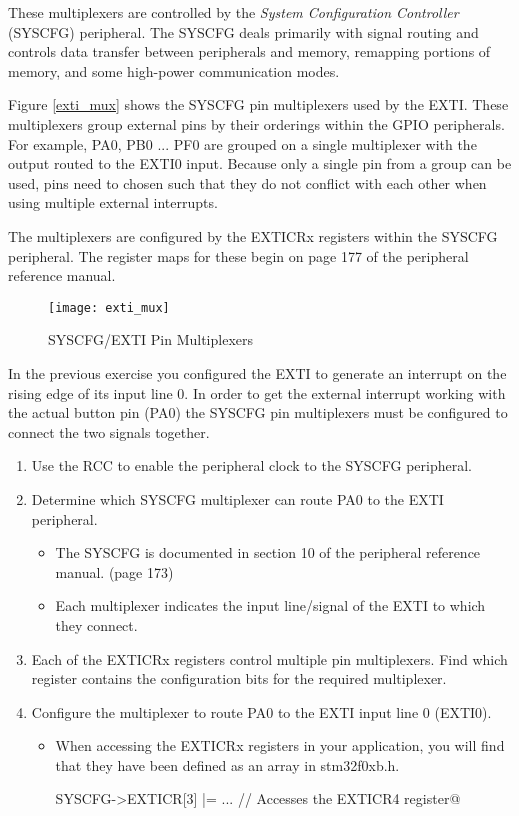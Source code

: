 \documentclass[11pt,fleqn]{book} %
\makeatletter
\newcommand{\ilcode}[1]{
    \smallskip
    \colorbox{gray!20!white}{
        \centering
        \parbox{\linewidth-2\fboxsep}{
            \lstinline@#1@
        }
    }
}
\makeatother
\begin{document}
These multiplexers are controlled by the \textit{System Configuration Controller} (SYSCFG) peripheral. The SYSCFG deals primarily with signal routing and controls data transfer between peripherals and memory, remapping portions of memory, and some high-power communication modes. 

Figure \vref{exti_mux} shows the SYSCFG pin multiplexers used by the EXTI. These multiplexers group external pins by their orderings within the GPIO peripherals. For example, PA0, PB0 ... PF0 are grouped on a single multiplexer with the output routed to the EXTI0 input. Because only a single pin from a group can be used, pins need to chosen such that they do not conflict with each other when using multiple external interrupts.

The multiplexers are configured by the EXTICRx registers within the SYSCFG peripheral. The register maps for these begin on page 177 of the peripheral reference manual. 

\begin{figure}[]
    \centering\texttt{[image: exti\_mux]}
    \caption{SYSCFG/EXTI Pin Multiplexers}
    \label{exti_mux}
\end{figure}

\begin{exercise}
    \label{ex3}
    In the previous exercise you configured the EXTI to generate an interrupt on the rising edge of its input line 0. In order to get the external interrupt working with the actual button pin (PA0) the SYSCFG pin multiplexers must be configured to connect the two signals together. 
    \begin{enumerate}
        \item Use the RCC to enable the peripheral clock to the SYSCFG peripheral.
        \item Determine which SYSCFG multiplexer can route PA0 to the EXTI peripheral.
        \begin{itemize}
            \item The SYSCFG is documented in section 10 of the peripheral reference manual. (page 173)
            \item Each multiplexer indicates the input line/signal of the EXTI to which they connect.
        \end{itemize}
        \item Each of the EXTICRx registers control multiple pin multiplexers. Find which register contains the configuration bits for the required multiplexer. 
        \item Configure the multiplexer to route PA0 to the EXTI input line 0 (EXTI0).
        \begin{itemize}
            \item When accessing the EXTICRx registers in your application, you will find that they have been defined as an array in stm32f0xb.h. \\
            \ilcode{SYSCFG->EXTICR[3] |= ...   // Accesses the EXTICR4 register}
        \end{itemize} 
    \end{enumerate}
\end{exercise}
\end{document}
